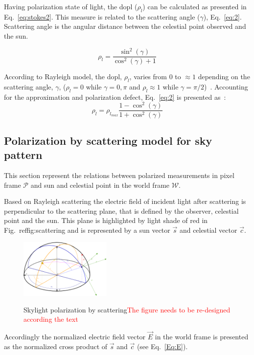 Having polarization state of light, the \gls{dopl} ($\rho_{l}$) can be
calculated as presented in Eq.~\ref{eq:stokes2}. This measure is related to the
scattering angle ($\gamma$), Eq.~\ref{eq:2}.
Scattering angle is the angular distance between the celestial point observed
and the sun.

\begin{equation}
  \label{eq:2}
  \rho_{l} = \frac{\sin^{2}(\gamma)}{\cos^{
      2}(\gamma)+1}
\end{equation}

According to Rayleigh model, the \gls{dopl}, $\rho_{l}$, varies
from 0 to $\approx 1$ depending on the scattering angle, $\gamma$, ($\rho_{l} =
0$ while $\gamma = 0, \pi$ and $\rho_{l} \approx 1$ while $\gamma =
\pi/2$)~\cite{smith2007polarization, miyazaki09sunlightpolarization}.
Accounting for the approximation and polarization defect, Eq.~\ref{eq:2}
is presented as~\cite{pomozi2001clearsky}:
\begin{equation}
  \label{eq:3}
  \rho_{l} = \rho_{l_{max}}\frac{1 - \cos^{2}(\gamma)}{1 + \cos^{
      2}(\gamma)}
\end{equation}


\subsection{Polarization by scattering model for sky pattern}
\label{subsec:pscattering}
This section represent the relations between polarized measurements in pixel
frame $\mathcal{P}$ and sun and celestial point in the world frame
$\mathcal{W}$.

Based on Rayleigh scattering the electric field of incident light after
scattering is perpendicular to the scattering plane, that is defined by the
observer, celestial point and the sun.
This plane is highlighted by light shade of red in Fig.~ref{fig:scattering} and
is represented by a sun vector $\vec{s}$ and celestial vector $\vec{c}$.

\begin{figure}
  \centering
  \includegraphics[width=0.4\textwidth]{./content/intro/figures/polasky4-crop.pdf}
  \label{fig:scattering}
  \caption{Skylight polarization by scattering\textcolor{red}{The figure needs
      to be re-designed according the text}}
\end{figure}
Accordingly the normalized electric field vector $\vec{E}$ in the world frame
is presented as the normalized cross product of $\vec{s}$ and
$\vec{c}$ (see Eq.~\ref{Eq:E}).


